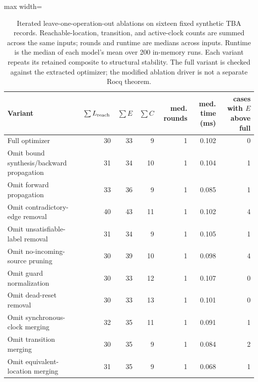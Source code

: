 \begin{table}[t]
\centering
\caption{Iterated leave-one-operation-out ablations on sixteen fixed synthetic TBA records. Reachable-location, transition, and active-clock counts are summed across the same inputs; rounds and runtime are medians across inputs. Runtime is the median of each model's mean over 200 in-memory runs. Each variant repeats its retained composite to structural stability. The full variant is checked against the extracted optimizer; the modified ablation driver is not a separate Rocq theorem.}
\label{tab:synthetic-ablation}
\scriptsize
\setlength{\tabcolsep}{3pt}
\begin{adjustbox}{max width=\textwidth}\begin{tabular}{@{}p{}rrrrrr@{}}
\toprule
Variant & $\sum L_{\rm reach}$ & $\sum E$ & $\sum C$ & med. rounds & med. time (ms) & cases with $E$ above full\\
\midrule
Full optimizer & 30 & 33 & 9 & 1 & 0.102 & 0 \\
Omit bound synthesis/backward propagation & 31 & 34 & 10 & 1 & 0.104 & 1 \\
Omit forward propagation & 33 & 36 & 9 & 1 & 0.085 & 1 \\
Omit contradictory-edge removal & 40 & 43 & 11 & 1 & 0.102 & 4 \\
Omit unsatisfiable-label removal & 31 & 34 & 9 & 1 & 0.105 & 1 \\
Omit no-incoming-source pruning & 30 & 39 & 10 & 1 & 0.098 & 4 \\
Omit guard normalization & 30 & 33 & 12 & 1 & 0.107 & 0 \\
Omit dead-reset removal & 30 & 33 & 13 & 1 & 0.101 & 0 \\
Omit synchronous-clock merging & 32 & 35 & 11 & 1 & 0.091 & 1 \\
Omit transition merging & 30 & 35 & 9 & 1 & 0.084 & 2 \\
Omit equivalent-location merging & 31 & 35 & 9 & 1 & 0.068 & 1 \\
\bottomrule
\end{tabular}\end{adjustbox}
\end{table}
